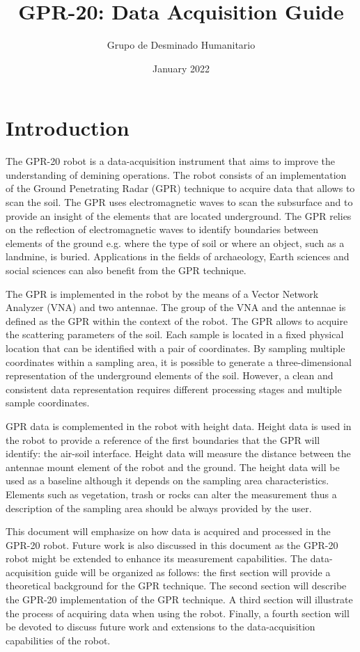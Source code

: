 \documentclass{article}
\title{GPR-20: Data Acquisition Guide}
\author{Grupo de Desminado Humanitario}
\date{January 2022}
\begin{document}


\section{Introduction}
The GPR-20 robot is a data-acquisition instrument that aims to improve the understanding of demining operations. The robot consists of an implementation of the Ground Penetrating Radar (GPR) technique to acquire data that allows to scan the soil. The GPR uses electromagnetic waves to scan the subsurface and to provide an insight of the elements that are located underground. The GPR relies on the reflection of electromagnetic waves to identify boundaries between elements of the ground e.g. where the type of soil or where an object, such as a landmine, is buried. Applications in the fields of archaeology, Earth sciences and social sciences can also benefit from the GPR technique.

The GPR is implemented in the robot by the means of a Vector Network Analyzer (VNA) and two antennae. The group of the VNA and the antennae is defined as the GPR within the context of the robot. The GPR allows to acquire the scattering parameters of the soil. Each sample is located in a fixed physical location that can be identified with a pair of coordinates. By sampling multiple coordinates within a sampling area, it is possible to generate a three-dimensional representation of the underground elements of the soil. However, a clean and consistent data representation requires different processing stages and multiple sample coordinates.

GPR data is complemented in the robot with height data. Height data is used in the robot to provide a reference of the first boundaries that the GPR will identify: the air-soil interface. Height data will measure the distance between the antennae mount element of the robot and the ground. The height data will be used as a baseline although it depends on the sampling area characteristics. Elements such as vegetation, trash or rocks can alter the measurement thus a description of the sampling area should be always provided by the user.

This document will emphasize on how data is acquired and processed in the GPR-20 robot. Future work is also discussed in this document as the GPR-20 robot might be extended to enhance its measurement capabilities. The data-acquisition guide will be organized as follows: the first section will provide a theoretical background for the GPR technique. The second section will describe the GPR-20 implementation of the GPR technique. A third section will illustrate the process of acquiring data when using the robot. Finally, a fourth section will be devoted to discuss future work and extensions to the data-acquisition capabilities of the robot.
\end{document}
